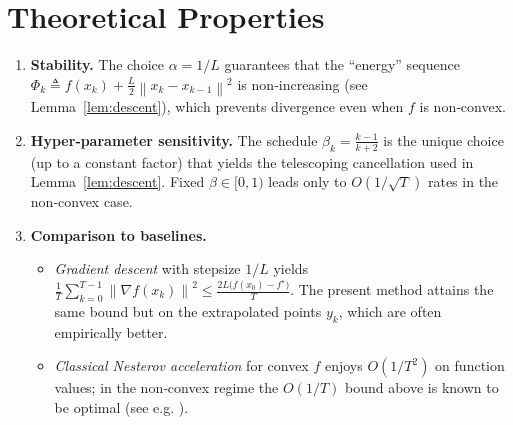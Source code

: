 \documentclass{article}
\newcommand{\grad}{\nabla}
\newcommand{\norm}[1]{\left\|#1\right\|}
\begin{document}
\section*{Theoretical Properties}
\begin{enumerate}[label={\bf P\arabic*}.]
\item \textbf{Stability.} The choice $\alpha=1/L$ guarantees that the ``energy'' sequence
\(
\Phi_k\triangleq f(x_k)+\tfrac{L}{2}\norm{x_k-x_{k-1}}^{2}
\)
is non‑increasing (see Lemma~\ref{lem:descent}), which prevents divergence even when $f$ is non‑convex.
\item \textbf{Hyper‑parameter sensitivity.} The schedule $\beta_k=\frac{k-1}{k+2}$ is the unique choice (up to a constant factor) that yields the telescoping cancellation used in Lemma~\ref{lem:descent}.  Fixed $\beta\in[0,1)$ leads only to $O(1/\sqrt{T})$ rates in the non‑convex case.
\item \textbf{Comparison to baselines.}
    \begin{itemize}
        \item \emph{Gradient descent} with stepsize $1/L$ yields
          $\frac{1}{T}\sum_{k=0}^{T-1}\norm{\grad f(x_k)}^{2}\le
          \frac{2L\bigl(f(x_0)-f^\star\bigr)}{T}$.
          The present method attains the same bound but on the extrapolated points $y_k$, which are often empirically better.
        \item \emph{Classical Nesterov acceleration} for convex $f$ enjoys $O(1/T^{2})$ on function values; in the non‑convex regime the $O(1/T)$ bound above is known to be optimal (see e.g. \cite{ghadimi2016accelerated}).
    \end{itemize}
\end{enumerate}

\end{document}
